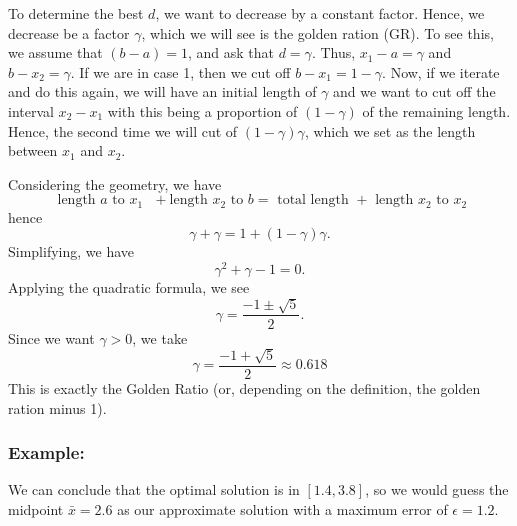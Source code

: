 \documentclass[../open-optimization/open-optimization.tex]{subfiles}
\begin{document}
To determine the best $d$, we want to decrease by a constant factor.  Hence, we decrease be a factor $\gamma$, which we will see is the golden ration (GR).  To see this, we assume that $(b-a) = 1$, and ask that $d = \gamma$.  Thus, $x_1 - a = \gamma$ and $b - x_2 = \gamma$.  If we are in case 1, then we cut off $b-x_1 = 1-\gamma$.  Now, if we iterate and do this again, we will have an initial length of $\gamma$ and we want to cut off the interval $x_2 - x_1$ with this being a proportion of $(1-\gamma)$ of the remaining length.  Hence, the second time we will cut of $(1-\gamma)\gamma$, which we set as the length between $x_1$ and $x_2$.  

Considering the geometry, we have
$$
\text{ length $a$ to $x_1$ } + \text{length $x_2$ to $b$} = \text{ total length } + \text{ length $x_2$ to $x_2$}
$$ 
hence
$$
\gamma + \gamma = 1 + (1-\gamma)\gamma.
$$
Simplifying, we have
$$
\gamma^2 + \gamma - 1 = 0.
$$
Applying the quadratic formula, we see
$$
\gamma = \frac{-1 \pm \sqrt{5}}{2}.
$$
Since we want $\gamma > 0$, we take 
$$
\gamma = \frac{-1 + \sqrt{5}}{2} \approx 0.618
$$
This is exactly the Golden Ratio (or, depending on the definition, the golden ration minus 1).



\subsubsection{Example:}

We can conclude that the optimal solution is in $[1.4,3.8]$, so we would guess the midpoint $\bar x = 2.6$ as our approximate solution with a maximum error of $\epsilon = 1.2$.
\end{document}
